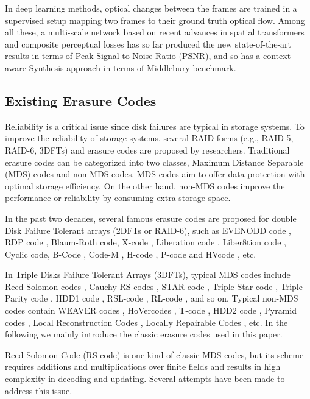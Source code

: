 \documentclass[sigconf]{acmart}
\begin{document}
In deep learning methods, optical changes between the frames are trained in a supervised setup mapping two frames to their ground truth optical flow. Among all these, a multi-scale network\cite{van2017frame} based on recent advances in spatial transformers and composite perceptual losses has so far produced the new state-of-the-art results in terms of Peak Signal to Noise Ratio (PSNR), and so has a context-aware Synthesis approach\cite{niklaus2018context} in terms of Middlebury benchmark.


\subsection{Existing Erasure Codes}\label{existEC}

Reliability is a critical issue since disk failures are typical in storage systems. To improve the reliability of storage systems, several RAID forms (e.g., RAID-5, RAID-6, 3DFTs) and erasure codes are proposed by researchers.  Traditional erasure codes can be categorized into two classes, Maximum Distance Separable (MDS) codes and non-MDS codes. MDS codes aim to offer data protection with optimal storage efficiency. On the other hand, non-MDS codes improve the performance or reliability by consuming extra storage space.

In the past two decades, several famous erasure codes are proposed for double Disk Failure Tolerant arrays (2DFTs or RAID-6), such as EVENODD code \cite{EVENODD}, RDP code \cite{RDP}, Blaum-Roth code\cite{BlaumRoth}, X-code \cite{XCode}, Liberation code \cite{Liberation}, Liber8tion code \cite{Liber8tion}, Cyclic \cite {Cyclic} code, B-Code \cite{BCode}, Code-M \cite{Code-M}, H-code \cite{hcode}, P-code \cite{PCode} and HVcode \cite{HVCode}, etc.

In Triple Disks Failure Tolerant Arrays (3DFTs), typical MDS codes include Reed-Solomon codes \cite{RS}, Cauchy-RS codes \cite{CRS}, STAR code \cite{STAR}, Triple-Star code \cite{TripleStar}, Triple-Parity code \cite{TPtech}, HDD1 code \cite{HDD}, RSL-code \cite{RSL}, RL-code \cite{RL}, and so on. Typical non-MDS codes contain WEAVER codes \cite{WEAVER}, HoVercodes \cite{HoVer}, T-code \cite{TCode}, HDD2 code \cite{HDD}, Pyramid codes \cite{Pyramid}, Local Reconstruction Codes \cite{LRC}, Locally Repairable Codes \cite{XORing}, etc.
In the following we mainly introduce the classic erasure codes used in this paper.

Reed Solomon Code \cite{RS} (RS code) is one kind of classic MDS codes, but its scheme requires additions and multiplications over finite fields and results in high complexity in decoding and updating. Several attempts have been made to address this issue.
\end{document}

